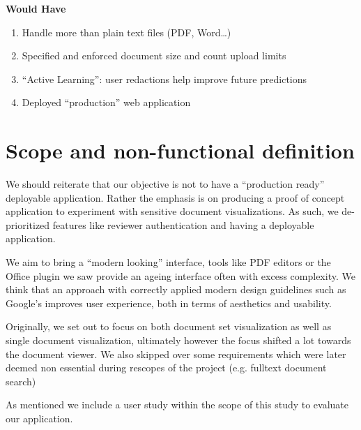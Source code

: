 \documentclass[\version]{l4proj}
\begin{document}
\begin{adjustbox}{width=0.9\textwidth,center}
    \begin{minipage}[t]{\linewidth}
        \centerline{\textbf{Would Have}}
        \begin{multicols}{2}
            \begin{enumerate}[noitemsep,nolistsep,label=\textbf{W\arabic*}]
                \item Handle more than plain text files (PDF, Word\ldots)
                \item Specified and enforced document size and count upload limits
                \item ``Active Learning'': user redactions help improve future predictions
                \item Deployed ``production'' web application
            \end{enumerate}
        \end{multicols}
    \end{minipage}
\end{adjustbox}
\section{Scope and non-functional definition}

We should reiterate that our objective is not to have a ``production ready'' deployable application.
Rather the emphasis is on producing a proof of concept application to experiment with sensitive document visualizations.
As such, we de-prioritized features like reviewer authentication and having a deployable application.

We aim to bring a ``modern looking'' interface, tools like PDF editors or the Office plugin we saw provide an ageing interface often with excess complexity.
We think that an approach with correctly applied modern design guidelines such as Google's \textcite{MaterialDesign} improves user experience, both in terms of aesthetics and usability.

Originally, we set out to focus on both document set visualization as well as single document visualization, ultimately however the focus shifted a lot towards the document viewer.
We also skipped over some requirements which were later deemed non essential during rescopes of the project (e.g. fulltext document search)

As mentioned we include a user study within the scope of this study to evaluate our application.
\end{document}
